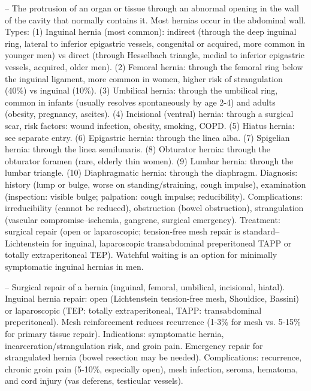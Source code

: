 -- The protrusion of an organ or tissue through an abnormal opening in the wall of the cavity that normally contains it. Most hernias occur in the abdominal wall. Types: (1) Inguinal hernia (most common): indirect (through the deep inguinal ring, lateral to inferior epigastric vessels, congenital or acquired, more common in younger men) vs direct (through Hesselbach triangle, medial to inferior epigastric vessels, acquired, older men). (2) Femoral hernia: through the femoral ring below the inguinal ligament, more common in women, higher risk of strangulation (40\%) vs inguinal (10\%). (3) Umbilical hernia: through the umbilical ring, common in infants (usually resolves spontaneously by age 2-4) and adults (obesity, pregnancy, ascites). (4) Incisional (ventral) hernia: through a surgical scar, risk factors: wound infection, obesity, smoking, COPD. (5) Hiatus hernia: see separate entry. (6) Epigastric hernia: through the linea alba. (7) Spigelian hernia: through the linea semilunaris. (8) Obturator hernia: through the obturator foramen (rare, elderly thin women). (9) Lumbar hernia: through the lumbar triangle. (10) Diaphragmatic hernia: through the diaphragm. Diagnosis: history (lump or bulge, worse on standing/straining, cough impulse), examination (inspection: visible bulge; palpation: cough impulse; reducibility). Complications: irreducibility (cannot be reduced), obstruction (bowel obstruction), strangulation (vascular compromise--ischemia, gangrene, surgical emergency). Treatment: surgical repair (open or laparoscopic; tension-free mesh repair is standard--Lichtenstein for inguinal, laparoscopic transabdominal preperitoneal TAPP or totally extraperitoneal TEP). Watchful waiting is an option for minimally symptomatic inguinal hernias in men.

-- Surgical repair of a hernia (inguinal, femoral, umbilical, incisional, hiatal). Inguinal hernia repair: open (Lichtenstein tension-free mesh, Shouldice, Bassini) or laparoscopic (TEP: totally extraperitoneal, TAPP: transabdominal preperitoneal). Mesh reinforcement reduces recurrence (1-3\% for mesh vs. 5-15\% for primary tissue repair). Indications: symptomatic hernia, incarceration/strangulation risk, and groin pain. Emergency repair for strangulated hernia (bowel resection may be needed). Complications: recurrence, chronic groin pain (5-10\%, especially open), mesh infection, seroma, hematoma, and cord injury (vas deferens, testicular vessels).

